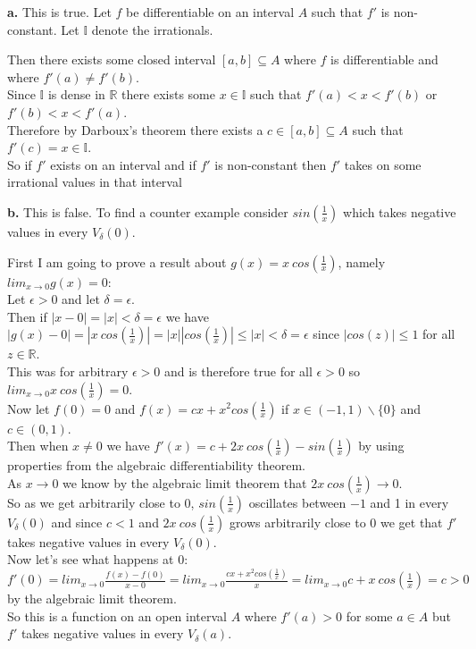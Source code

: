 \documentclass{article}
\begin{document}
{\Large\textbf{a.}} This is true. Let $f$ be differentiable on an interval $A$ such that $f'$ is non-constant. Let $\mathbb{I}$ denote the irrationals.
\begin{center}
    \doublespacing
    Then there exists some closed interval $[a, b]\subseteq A$ where $f$ is differentiable and where $f'(a)\neq f'(b)$.
    \\Since $\mathbb{I}$ is dense in $\mathbb{R}$ there exists some $x\in\mathbb{I}$ such that $f'(a) < x < f'(b)$ or $f'(b) < x < f'(a)$.
    \\Therefore by Darboux's theorem there exists a $c\in [a, b]\subseteq A$ such that $f'(c) = x\in\mathbb{I}$.
    \\So if $f'$ exists on an interval and if $f'$ is non-constant then $f'$ takes on some irrational values in that interval \qedsymbol
\end{center}

{\Large\textbf{b.}} This is false. To find a counter example consider $sin(\frac{1}{x})$ which takes negative values in every $V_{\delta}(0)$.
\begin{center}
    \doublespacing
    First I am going to prove a result about $g(x) = x\:cos(\frac{1}{x})$, namely $lim_{x\rightarrow 0} g(x) = 0$:
    \\Let $\epsilon > 0$ and let $\delta =\epsilon$.
    \\Then if $|x - 0| = |x| <\delta =\epsilon$ we have $|g(x) - 0| = |x\:cos(\frac{1}{x})| = |x||cos(\frac{1}{x})|\leq |x| <\delta =\epsilon$ since $|cos(z)|\leq 1$ for all $z\in\mathbb{R}$.
    \\This was for arbitrary $\epsilon > 0$ and is therefore true for all $\epsilon > 0$ so $lim_{x\rightarrow 0} x\:cos(\frac{1}{x}) = 0$.
    \\Now let $f(0) = 0$ and $f(x) = cx + x^2 cos(\frac{1}{x})$ if $x\in (-1, 1)\backslash\{0\}$ and $c\in (0, 1)$.
    \\Then when $x\neq 0$ we have $f'(x) = c + 2x\:cos(\frac{1}{x}) - sin(\frac{1}{x})$ by using properties from the algebraic differentiability theorem.
    \\As $x\rightarrow 0$ we know by the algebraic limit theorem that $2x\:cos(\frac{1}{x})\rightarrow 0$.
    \\So as we get arbitrarily close to 0, $sin(\frac{1}{x})$ oscillates between $-1$ and 1 in every $V_{\delta}(0)$ and since $c < 1$ and $2x\:cos(\frac{1}{x})$ grows arbitrarily close to 0 we get that $f'$ takes negative values in every $V_{\delta}(0)$.
    \\Now let's see what happens at 0:
    \\$f'(0) = lim_{x\rightarrow 0}\frac{f(x) - f(0)}{x - 0} = lim_{x\rightarrow 0}\frac{cx + x^2 cos(\frac{1}{x})}{x} = lim_{x\rightarrow 0} c + x\:cos(\frac{1}{x}) = c > 0$ by the algebraic limit theorem.
    \\So this is a function on an open interval $A$ where $f'(a) > 0$ for some $a\in A$ but $f'$ takes negative values in every $V_{\delta}(a)$.
\end{center}
\end{document}

